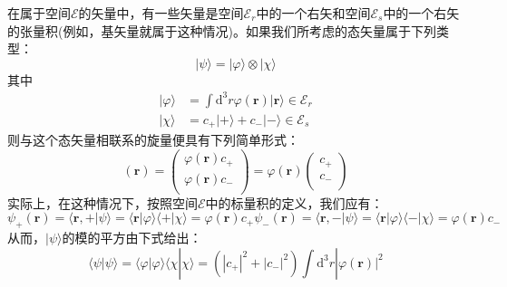 \documentclass[]{article}
\begin{document}
在属于空间$\mathscr{E}$的矢量中，有一些矢量是空间$\mathscr{E}_r$中的一个右矢和空间$\mathscr{E}_s$中的一个右矢的张量积(例如，基矢量就属于这种情况)。如果我们所考虑的态矢量属于下列类型：
\begin{equation}
	|\psi\rangle=|\varphi\rangle\otimes|\chi\rangle
\end{equation}
其中
\begin{align}
	|\varphi\rangle&=\int\mathrm{d}^3r\varphi(\boldsymbol{r})|\boldsymbol{r}\rangle\in\mathscr{E}_r\nonumber\\
	|\chi\rangle&=c_+|+\rangle+c_-|-\rangle\in\mathscr{E}_s
\end{align}
则与这个态矢量相联系的旋量便具有下列简单形式：
\begin{equation}
	[\psi](\boldsymbol{r})=\begin{pmatrix}
		\varphi(\boldsymbol{r})c_+\\
		\varphi(\boldsymbol{r})c_-\\
	\end{pmatrix}=\varphi(\boldsymbol{r})\begin{pmatrix}
	c_+\\
	c_-\\
	\end{pmatrix}
\end{equation}
实际上，在这种情况下，按照空间$\mathscr{E}$中的标量积的定义，我们应有：
\begin{subequations}
	\begin{equation}
		\psi_+(\boldsymbol{r})=\langle \boldsymbol{r},+|\psi\rangle=\langle \boldsymbol{r}|\varphi\rangle\langle+|\chi\rangle=\varphi(\boldsymbol{r})c_+
	\end{equation}
	\begin{equation}
		\psi_-(\boldsymbol{r})=\langle \boldsymbol{r},-|\psi\rangle=\langle \boldsymbol{r}|\varphi\rangle\langle-|\chi\rangle=\varphi(\boldsymbol{r})c_-
	\end{equation}
\end{subequations}
从而，$|\psi\rangle$的模的平方由下式给出：
\begin{equation}
	\langle\psi|\psi\rangle=\langle\varphi|\varphi\rangle\langle\chi|\chi\rangle=(|c_+|^2+|c_-|^2)\int\mathrm{d}^3r|\varphi(\boldsymbol{r})|^2
\end{equation}
\end{document}
